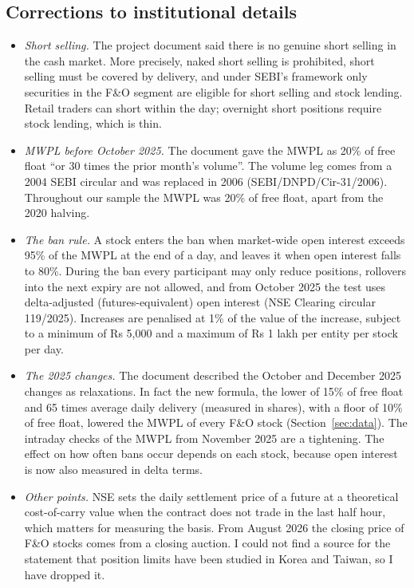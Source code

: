 \documentclass[11pt,a4paper]{article}
\begin{document}
\subsection{Corrections to institutional details}
\begin{itemize}
\item \emph{Short selling.} The project document said there is no genuine short selling in the cash market. More precisely,
naked short selling is prohibited, short selling must be covered by delivery, and under SEBI's framework only securities in
the F\&O segment are eligible for short selling and stock lending. Retail traders can short within the day; overnight short
positions require stock lending, which is thin.
\item \emph{MWPL before October 2025.} The document gave the MWPL as 20\% of free float ``or 30 times the prior month's
volume''. The volume leg comes from a 2004 SEBI circular and was replaced in 2006 (SEBI/DNPD/Cir-31/2006). Throughout our
sample the MWPL was 20\% of free float, apart from the 2020 halving.
\item \emph{The ban rule.} A stock enters the ban when market-wide open interest exceeds 95\% of the MWPL at the end of a day,
and leaves it when open interest falls to 80\%. During the ban every participant may only reduce positions, rollovers into the
next expiry are not allowed, and from October 2025 the test uses delta-adjusted (futures-equivalent) open interest
(NSE Clearing circular 119/2025). Increases are penalised at 1\% of the value of the increase, subject to a minimum of
Rs 5,000 and a maximum of Rs 1 lakh per entity per stock per day.
\item \emph{The 2025 changes.} The document described the October and December 2025 changes as relaxations. In fact the new
formula, the lower of 15\% of free float and 65 times average daily delivery (measured in shares), with a floor of 10\% of free
float, lowered the MWPL of every F\&O stock (Section~\ref{sec:data}). The intraday checks of the MWPL from November 2025 are a
tightening. The effect on how often bans occur depends on each stock, because open interest is now also measured in delta terms.
\item \emph{Other points.} NSE sets the daily settlement price of a future at a theoretical cost-of-carry value when the
contract does not trade in the last half hour, which matters for measuring the basis. From August 2026 the closing price of
F\&O stocks comes from a closing auction. I could not find a source for the statement that position limits have been studied
in Korea and Taiwan, so I have dropped it.
\end{itemize}
\end{document}
